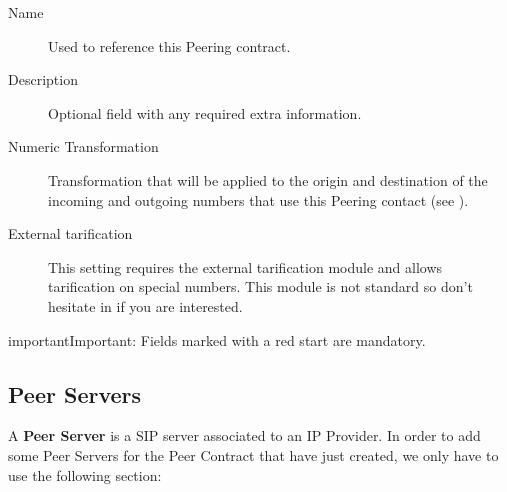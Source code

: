 \documentclass[letterpaper,10pt,english]{sphinxmanual}
\begin{document}
\begin{description}
\item[{Name}] \leavevmode{}\label{brand/peering/peering_contracts:term-name}
Used to reference this Peering contract.

\item[{Description}] \leavevmode{}\label{brand/peering/peering_contracts:term-description}
Optional field with any required extra information.

\item[{Numeric Transformation}] \leavevmode{}\label{brand/peering/peering_contracts:term-numeric-transformation}
Transformation that will be applied to the origin and destination of the
incoming and outgoing numbers that use this Peering contact
(see {\hyperref[brand/transformations/index:numeric\string-transformations]{}}).

\item[{External tarification}] \leavevmode{}\label{brand/peering/peering_contracts:term-external-tarification}
This setting requires the external tarification module and allows
tarification on special numbers. This module is not standard so don't
hesitate in {\hyperref[basics/intro/getting_help:getting\string-help]{}} if you are interested.

\end{description}

\begin{notice}{important}{Important:}
Fields marked with a red start are mandatory.
\end{notice}


\subsection{Peer Servers}
\label{brand/peering/peer_servers::doc}\label{brand/peering/peer_servers:peer-servers}
A \textbf{Peer Server} is a SIP server associated to an IP Provider.
In order to add some Peer Servers for the Peer Contract that
have just created, we only have to use the following section:

\end{document}
